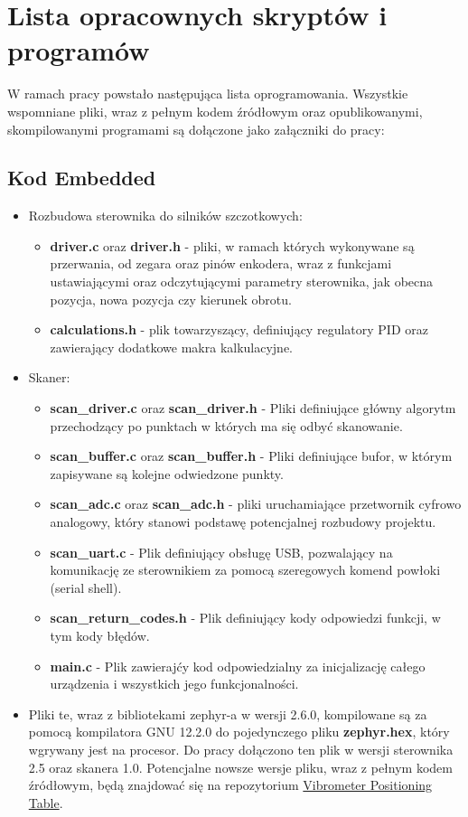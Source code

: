 \chapter{Lista opracownych skryptów i programów}
W ramach pracy powstało następująca lista oprogramowania. Wszystkie wspomniane pliki, wraz z pełnym kodem źródłowym oraz opublikowanymi, skompilowanymi programami są dołączone jako załączniki do pracy:
\section{Kod Embedded}
\begin{itemize}
    \item Rozbudowa sterownika do silników szczotkowych:
    \begin{itemize}
        \item \textbf{driver.c} oraz \textbf{driver.h} - pliki, w ramach których wykonywane są przerwania, od zegara oraz pinów enkodera, wraz z funkcjami ustawiającymi oraz odczytującymi parametry sterownika, jak obecna pozycja, nowa pozycja czy kierunek obrotu.
        \item \textbf{calculations.h} - plik towarzyszący, definiujący regulatory PID oraz zawierający dodatkowe makra kalkulacyjne.
    \end{itemize}
    \item Skaner:
    \begin{itemize}
        \item \textbf{scan\_driver.c} oraz \textbf{scan\_driver.h} - Pliki definiujące główny algorytm przechodzący po punktach w których ma się odbyć skanowanie.
        \item \textbf{scan\_buffer.c} oraz \textbf{scan\_buffer.h} - Pliki definiujące bufor, w którym zapisywane są kolejne odwiedzone punkty.
        \item \textbf{scan\_adc.c} oraz \textbf{scan\_adc.h} - pliki uruchamiające przetwornik cyfrowo analogowy, który stanowi podstawę potencjalnej rozbudowy projektu.
        \item \textbf{scan\_uart.c} - Plik definiujący obsługę USB, pozwalający na komunikację ze sterownikiem za pomocą szeregowych komend powłoki (serial shell).
        \item \textbf{scan\_return\_codes.h} - Plik definiujący kody odpowiedzi funkcji, w tym kody błędów.
        \item \textbf{main.c} - Plik zawierajćy kod odpowiedzialny za inicjalizację całego urządzenia i wszystkich jego funkcjonalności.
    \end{itemize}
    \item Pliki te, wraz z bibliotekami zephyr-a w wersji 2.6.0, kompilowane są za pomocą kompilatora GNU 12.2.0 do pojedynczego pliku \textbf{zephyr.hex}, który wgrywany jest na procesor. Do pracy dołączono ten plik w wersji sterownika 2.5 oraz skanera 1.0. Potencjalne nowsze wersje pliku, wraz z pełnym kodem źródłowym, będą znajdować się na repozytorium \href{https://github.com/eSqadron/Vibrometer-Positioning-Table}{Vibrometer Positioning Table}.
\end{itemize}
